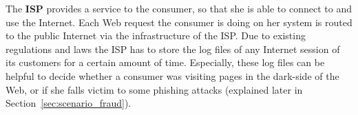 The \textbf{ISP} provides a service to the consumer, so that she is able to connect to and use the Internet. Each Web request the consumer is doing on her system is routed to the public Internet via the infrastructure of the \gls{ISP}. Due to existing regulations and laws the \gls{ISP} has to store the log files of any Internet session of its customers for a certain amount of time. Especially, these log files can be helpful to decide whether a consumer was visiting pages in the dark-side of the Web, or if she falls victim to some phishing attacks (explained later in Section~\ref{sec:scenario_fraud}).


